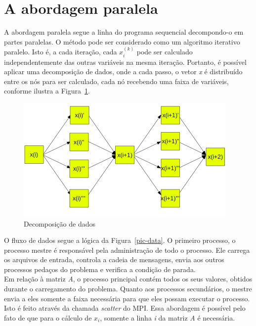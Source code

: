 \documentclass[a4paper]{article}
\begin{document}
\section{A abordagem paralela}
\indent \indent A abordagem paralela segue a linha do programa sequencial decompondo-o em partes paralelas. O método pode ser considerado como um algoritmo iterativo paralelo. Isto é, a cada iteração, cada \begin{math}x^{(k)}_i\end{math} pode ser calculado independentemente das outras variáveis na mesma iteração. Portanto, é possível aplicar uma decomposição de dados, onde a cada passo, o vetor \emph{x} é distribuído entre os nós para ser calculado, cada nó recebendo uma faixa de variáveis, conforme ilustra a Figura~\ref{pic-dec}.\\
\begin{figure}[float=p]
	\centerline{\includegraphics[width=408px, height=230px]{dec}}
	\caption{Decomposição de dados}
	\label{pic-dec}
\end{figure}
\indent O fluxo de dados segue a lógica da Figura~\ref{pic-data}. O primeiro processo, o processo mestre é responsável pela administração de todo o processo. Ele carrega os arquivos de entrada, controla a cadeia de mensagens, envia aos outros processos pedaços do problema e verifica a condição de parada.\\
\indent Em relação à matriz \emph{A}, o processo principal contém todos os seus valores, obtidos durante o carregamento do problema. Quanto aos processos secundários, o mestre envia a eles somente a faixa necessária para que eles possam executar o processo. Isto é feito através da chamada \emph{scatter} do MPI. Essa abordagem é possível pelo fato de que para o cálculo de \begin{math}x_i\end{math}, somente a linha \emph{i} da matriz \emph{A} é necessária.\\
\end{document}
